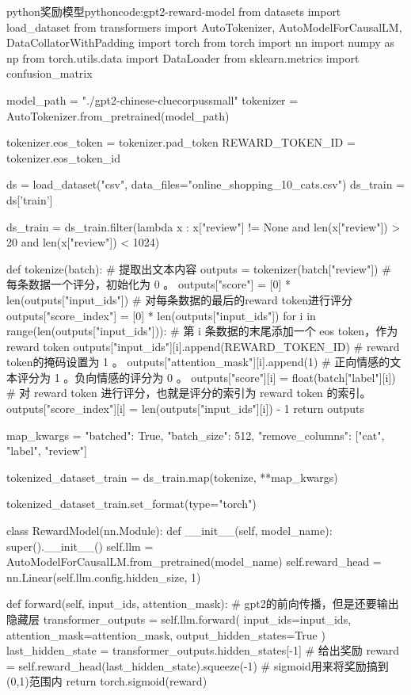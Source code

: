 \documentclass[lang=cn,newtx,10pt,scheme=chinese]{elegantbook}
\begin{document}
\begin{codebox}{python}{奖励模型}{pythoncode:gpt2-reward-model}
from datasets import load_dataset
from transformers import AutoTokenizer, AutoModelForCausalLM, DataCollatorWithPadding
import torch
from torch import nn
import numpy as np
from torch.utils.data import DataLoader
from sklearn.metrics import confusion_matrix

model_path = "./gpt2-chinese-cluecorpussmall"
tokenizer = AutoTokenizer.from_pretrained(model_path)

tokenizer.eos_token = tokenizer.pad_token
REWARD_TOKEN_ID = tokenizer.eos_token_id

ds = load_dataset("csv", data_files="online_shopping_10_cats.csv")
ds_train = ds['train']

ds_train = ds_train.filter(lambda x : x["review"] != None and len(x["review"]) > 20 and len(x["review"]) < 1024)

def tokenize(batch):
    # 提取出文本内容
    outputs = tokenizer(batch["review"])
    # 每条数据一个评分，初始化为 0 。
    outputs["score"] = [0] * len(outputs["input_ids"])
    # 对每条数据的最后的reward token进行评分
    outputs["score_index"] = [0] * len(outputs["input_ids"])
    for i in range(len(outputs["input_ids"])):
        # 第 i 条数据的末尾添加一个 eos token，作为reward token
        outputs["input_ids"][i].append(REWARD_TOKEN_ID)
        # reward token的掩码设置为 1 。
        outputs["attention_mask"][i].append(1)
        # 正向情感的文本评分为 1 。负向情感的评分为 0 。
        outputs["score"][i] = float(batch["label"][i])
        # 对 reward token 进行评分，也就是评分的索引为 reward token 的索引。
        outputs["score_index"][i] = len(outputs["input_ids"][i]) - 1
    return outputs

map_kwargs = {
    "batched": True,
    "batch_size": 512,
    "remove_columns": ["cat", "label", "review"]
}

tokenized_dataset_train = ds_train.map(tokenize, **map_kwargs)

tokenized_dataset_train.set_format(type="torch")

class RewardModel(nn.Module):
    def __init__(self, model_name):
        super().__init__()
        self.llm = AutoModelForCausalLM.from_pretrained(model_name)
        self.reward_head = nn.Linear(self.llm.config.hidden_size, 1)

    def forward(self, input_ids, attention_mask):
        # gpt2的前向传播，但是还要输出隐藏层
        transformer_outputs = self.llm.forward(
            input_ids=input_ids,
            attention_mask=attention_mask,
            output_hidden_states=True
        )
        last_hidden_state = transformer_outputs.hidden_states[-1]
        # 给出奖励
        reward = self.reward_head(last_hidden_state).squeeze(-1)
        # sigmoid用来将奖励搞到(0,1)范围内
        return torch.sigmoid(reward)


\end{codebox}
\end{document}
